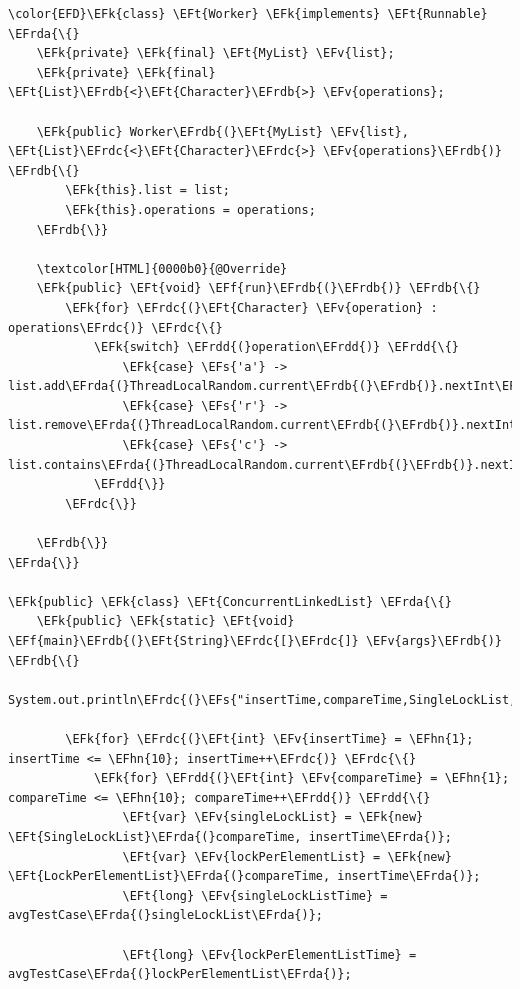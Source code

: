 \documentclass[11pt]{article}
\newcommand{\EFs}[1]{\textcolor{EFs}{#1}} %
\newcommand{\EFk}[1]{\textcolor{EFk}{#1}} %
\newcommand{\EFf}[1]{\textcolor{EFf}{#1}} %
\newcommand{\EFv}[1]{\textcolor{EFv}{#1}} %
\newcommand{\EFt}[1]{\textcolor{EFt}{#1}} %
\newcommand{\EFhn}[1]{\textcolor{EFhn}{#1}} %
\newcommand{\EFrda}[1]{#1} %
\newcommand{\EFrdb}[1]{\textcolor{EFrdb}{#1}} %
\newcommand{\EFrdc}[1]{\textcolor{EFrdc}{#1}} %
\newcommand{\EFrdd}[1]{\textcolor{EFrdd}{#1}} %
\begin{document}
\begin{Code}
\begin{Verbatim}
\color{EFD}\EFk{class} \EFt{Worker} \EFk{implements} \EFt{Runnable} \EFrda{\{}
    \EFk{private} \EFk{final} \EFt{MyList} \EFv{list};
    \EFk{private} \EFk{final} \EFt{List}\EFrdb{<}\EFt{Character}\EFrdb{>} \EFv{operations};

    \EFk{public} Worker\EFrdb{(}\EFt{MyList} \EFv{list}, \EFt{List}\EFrdc{<}\EFt{Character}\EFrdc{>} \EFv{operations}\EFrdb{)} \EFrdb{\{}
        \EFk{this}.list = list;
        \EFk{this}.operations = operations;
    \EFrdb{\}}

    \textcolor[HTML]{0000b0}{@Override}
    \EFk{public} \EFt{void} \EFf{run}\EFrdb{(}\EFrdb{)} \EFrdb{\{}
        \EFk{for} \EFrdc{(}\EFt{Character} \EFv{operation} : operations\EFrdc{)} \EFrdc{\{}
            \EFk{switch} \EFrdd{(}operation\EFrdd{)} \EFrdd{\{}
                \EFk{case} \EFs{'a'} -> list.add\EFrda{(}ThreadLocalRandom.current\EFrdb{(}\EFrdb{)}.nextInt\EFrdb{(}\EFhn{30}\EFrdb{)}\EFrda{)};
                \EFk{case} \EFs{'r'} -> list.remove\EFrda{(}ThreadLocalRandom.current\EFrdb{(}\EFrdb{)}.nextInt\EFrdb{(}\EFhn{30}\EFrdb{)}\EFrda{)};
                \EFk{case} \EFs{'c'} -> list.contains\EFrda{(}ThreadLocalRandom.current\EFrdb{(}\EFrdb{)}.nextInt\EFrdb{(}\EFhn{30}\EFrdb{)}\EFrda{)};
            \EFrdd{\}}
        \EFrdc{\}}

    \EFrdb{\}}
\EFrda{\}}

\EFk{public} \EFk{class} \EFt{ConcurrentLinkedList} \EFrda{\{}
    \EFk{public} \EFk{static} \EFt{void} \EFf{main}\EFrdb{(}\EFt{String}\EFrdc{[}\EFrdc{]} \EFv{args}\EFrdb{)} \EFrdb{\{}
        System.out.println\EFrdc{(}\EFs{"insertTime,compareTime,SingleLockList,LockPerElementList"}\EFrdc{)};

        \EFk{for} \EFrdc{(}\EFt{int} \EFv{insertTime} = \EFhn{1}; insertTime <= \EFhn{10}; insertTime++\EFrdc{)} \EFrdc{\{}
            \EFk{for} \EFrdd{(}\EFt{int} \EFv{compareTime} = \EFhn{1}; compareTime <= \EFhn{10}; compareTime++\EFrdd{)} \EFrdd{\{}
                \EFt{var} \EFv{singleLockList} = \EFk{new} \EFt{SingleLockList}\EFrda{(}compareTime, insertTime\EFrda{)};
                \EFt{var} \EFv{lockPerElementList} = \EFk{new} \EFt{LockPerElementList}\EFrda{(}compareTime, insertTime\EFrda{)};
                \EFt{long} \EFv{singleLockListTime} = avgTestCase\EFrda{(}singleLockList\EFrda{)};

                \EFt{long} \EFv{lockPerElementListTime} = avgTestCase\EFrda{(}lockPerElementList\EFrda{)};


\end{Verbatim}
\end{Code}
\end{document}
